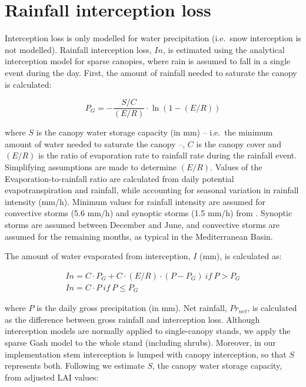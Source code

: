 \documentclass[]{book}
\begin{document}
\section{Rainfall interception loss}\label{interception}

Interception loss is only modelled for water precipitation (i.e.~snow
interception is not modelled). Rainfall interception loss, \(In\), is
estimated using the \citet{Gash1995} analytical interception model for
sparse canopies, where rain is assumed to fall in a single event during
the day. First, the amount of rainfall needed to saturate the canopy is
calculated:

\begin{equation}
P_G = - \frac{S/C}{(E/R)} \cdot \ln(1-(E/R))
\end{equation}

where \(S\) is the canopy water storage capacity (in mm) -- i.e.~the
minimum amount of water needed to saturate the canopy --, \(C\) is the
canopy cover and \((E/R)\) is the ratio of evaporation rate to rainfall
rate during the rainfall event. Simplifying assumptions are made to
determine \((E/R)\). Values of the Evaporation-to-rainfall ratio are
calculated from daily potential evapotranspiration and rainfall, while
accounting for seasonal variation in rainfall intensity (mm/h). Minimum
values for rainfall intensity are assumed for convective storms (5.6
mm/h) and synoptic storms (1.5 mm/h) from \citet{Miralles2010}. Synoptic
storms are assumed between December and June, and convective storms are
assumed for the remaining months, as typical in the Mediterranean Basin.

The amount of water evaporated from interception, \(I\) (mm), is
calculated as:

\begin{eqnarray}
In = C\cdot P_G+C\cdot(E/R)\cdot(P-P_G) \: {if}\: P > P_G \\
In = C\cdot P\: {if}\: P \leq P_G
\end{eqnarray}

where \(P\) is the daily gross precipitation (in mm). Net rainfall,
\(Pr_{net}\), is calculated as the difference between gross rainfall and
interception loss. Although interception models are normally applied to
single-canopy stands, we apply the sparse Gash model to the whole stand
(including shrubs). Moreover, in our implementation stem interception is
lumped with canopy interception, so that \(S\) represents both.
Following \citet{Watanabe1996} we estimate \(S\), the canopy water
storage capacity, from adjusted LAI values:
\end{document}
